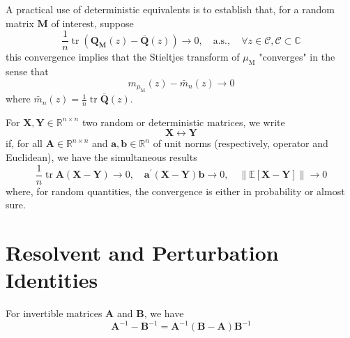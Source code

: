 \begin{remark}
    A practical use of deterministic equivalents is to establish that, for a random matrix $\mathbf{M}$ of interest, suppose
    \begin{equation*}
        \frac{1}{n}\operatorname{tr}\left(\mathbf{Q}_{\mathbf{M}}(z)-\overline{\mathbf{Q}}(z)\right)\rightarrow 0,\quad\text{a.s.},\quad\forall z\in\mathcal{C} ,\mathcal{C}\subset\mathbb{C}
    \end{equation*}
    this convergence implies that the Stieltjes transform of $\mu_{\mathrm{M}}$ "converges" in the sense that
    \begin{equation*}
        m_{\mu_{\mathrm{M}}}(z)-\bar{m}_{n}(z)\rightarrow 0
    \end{equation*}
    where $\bar{m}_{n}(z)=\frac{1}{n}\operatorname{tr}\overline{\mathbf{Q}}(z)$.
\end{remark}

\begin{definition}
    For $\mathbf{X},\mathbf{Y}\in\mathbb{R}^{n \times n}$ two random or deterministic matrices, we write
    \begin{equation}
        \mathbf{X}\leftrightarrow\mathbf{Y}
    \end{equation}
    if, for all $\mathbf{A}\in\mathbb{R}^{n\times n}$ and $\mathbf{a},\mathbf{b}\in\mathbb{R}^{n}$ of unit norms (respectively, operator and Euclidean), we have the simultaneous results
    \begin{equation*}
        \frac{1}{n}\operatorname{tr}\mathbf{A}(\mathbf{X}-\mathbf{Y})\rightarrow 0,\quad \mathbf{a}^{\prime}(\mathbf{X}-\mathbf{Y})\mathbf{b}\rightarrow 0,\quad\|\mathbb{E}[\mathbf{X}-\mathbf{Y}]\|\rightarrow 0
    \end{equation*}
    where, for random quantities, the convergence is either in probability or almost sure.
\end{definition}

\section{Resolvent and Perturbation Identities}

\begin{lemma} \label{lem:resolvent-identity}
    For invertible matrices $\mathbf{A}$ and $\mathbf{B}$, we have
    \begin{equation}
        \mathbf{A}^{-1}-\mathbf{B}^{-1}=\mathbf{A}^{-1}\left(\mathbf{B}-\mathbf{A}\right)\mathbf{B}^{-1}
    \end{equation}
\end{lemma}

